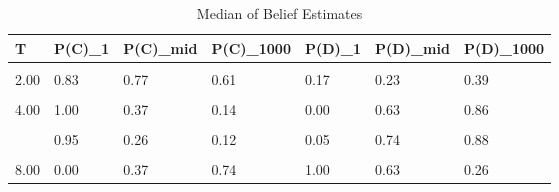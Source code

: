 \begin{table}[!h]
\centering
\caption{Median of Belief Estimates}
\centering
\begin{tabular}[t]{lllllll}
\toprule
T & P(C)\_1 & P(C)\_mid & P(C)\_1000 & P(D)\_1 & P(D)\_mid & P(D)\_1000\\
\midrule
\cellcolor{gray!10}{1.00} & \cellcolor{gray!10}{1.00} & \cellcolor{gray!10}{0.28} & \cellcolor{gray!10}{0.26} & \cellcolor{gray!10}{0.00} & \cellcolor{gray!10}{0.72} & \cellcolor{gray!10}{0.74}\\
2.00 & 0.83 & 0.77 & 0.61 & 0.17 & 0.23 & 0.39\\
\cellcolor{gray!10}{3.00} & \cellcolor{gray!10}{0.97} & \cellcolor{gray!10}{0.11} & \cellcolor{gray!10}{0.09} & \cellcolor{gray!10}{0.03} & \cellcolor{gray!10}{0.89} & \cellcolor{gray!10}{0.91}\\
4.00 & 1.00 & 0.37 & 0.14 & 0.00 & 0.63 & 0.86\\
\cellcolor{gray!10}{5.00} & \cellcolor{gray!10}{0.99} & \cellcolor{gray!10}{0.27} & \cellcolor{gray!10}{0.08} & \cellcolor{gray!10}{0.01} & \cellcolor{gray!10}{0.73} & \cellcolor{gray!10}{0.92}\\
\addlinespace
6.00 & 0.95 & 0.26 & 0.12 & 0.05 & 0.74 & 0.88\\
\cellcolor{gray!10}{7.00} & \cellcolor{gray!10}{0.00} & \cellcolor{gray!10}{0.24} & \cellcolor{gray!10}{0.78} & \cellcolor{gray!10}{1.00} & \cellcolor{gray!10}{0.76} & \cellcolor{gray!10}{0.22}\\
8.00 & 0.00 & 0.37 & 0.74 & 1.00 & 0.63 & 0.26\\
\bottomrule
\end{tabular}
\end{table}